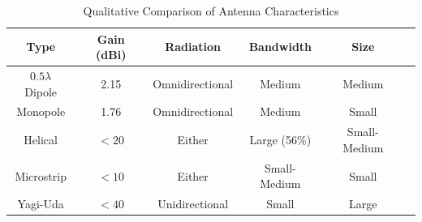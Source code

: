 \begin{table}[!htb]
  \centering
  \hspace*{-2cm}
  \renewcommand{\arraystretch}{1.2}
  \begin{tabular}{ |c|c|c|c|c|c| }
  \hline
  \textbf{Type} & \textbf{Gain (dBi)} & \textbf{Radiation} & \textbf{Bandwidth} & \textbf{Size} \\ \hline
  $0.5 \lambda$ Dipole & 2.15 & Omnidirectional & Medium & Medium \\ \hline
  Monopole & 1.76 & Omnidirectional & Medium & Small \\ \hline
  Helical & $<20$ & Either & Large (56\%) & Small-Medium \\ \hline
  Microstrip & $<10$ & Either & Small-Medium & Small \\ \hline
  Yagi-Uda & $<40$ & Unidirectional & Small & Large \\ \hline
  \end{tabular}
  \caption{Qualitative Comparison of Antenna Characteristics \cite{site-antennaTheory}}
  \label{tab:antenna_characteristics}
\end{table}